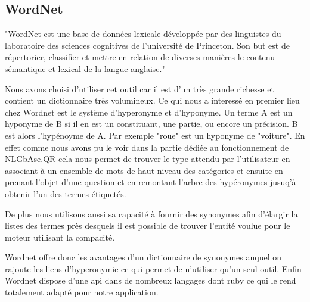 \documentclass[10pt,a4paper]{article}
\begin{document}
\subsection{WordNet}
\par "WordNet est une base de données lexicale développée par des linguistes du laboratoire des sciences cognitives de l'université de Princeton. Son but est de répertorier, classifier et mettre en relation de diverses manières le contenu sémantique et lexical de la langue anglaise."~\cite{wikipedia:wordnet}
\par Nous avons choisi d'utiliser cet outil car il est d'un très grande richesse et contient un dictionnaire très volumineux. Ce qui nous a interessé en premier lieu chez Wordnet est le système d'hyperonyme et d'hyponyme. Un terme A est un hyponyme de B si il en est un constituant, une partie, ou encore un précision. B est alors l'hypénoyme de A. Par exemple "roue" est un hyponyme de "voiture". En effet comme nous avons pu le voir dans la partie dédiée au fonctionnement de NLGbAse.QR cela nous permet de trouver le type attendu par l'utilisateur en associant à un ensemble de mots de haut niveau des catégories et ensuite en prenant l'objet d'une question et en remontant l'arbre des hypéronymes jusuq'à obtenir l'un des termes étiquetés.
\par De plus nous utilisons aussi sa capacité à fournir des synonymes afin d'élargir la listes des termes près desquels il est possible de trouver l'entité voulue pour le moteur utilisant la compacité.
\par Wordnet offre donc les avantages d'un dictionnaire de synonymes auquel on rajoute les liens d'hyperonymie ce qui permet de n'utiliser qu'un seul outil. Enfin Wordnet dispose d'une api dans de nombreux langages dont ruby ce qui le rend totalement adapté pour notre application.
\end{document}
